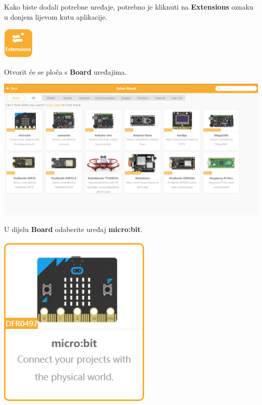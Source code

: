 Kako biste dodali potrebne uređaje, potrebno je kliknuti na \textbf{Extensions} oznaku u donjem lijevom kutu aplikacije.

\vspace{3mm}

\includegraphics[]{Mindplus4.png}

\vspace{3mm}

Otvorit će se ploča s \textbf{Board} uređajima.

\vspace{3mm}

\includegraphics[scale=0.4]{Mindplus5.png}

\vspace{3mm}

U dijelu \textbf{Board} odaberite uređaj \textbf{micro:bit}.

\vspace{3mm}

\includegraphics[scale=0.6]{Mindplus6.png}

